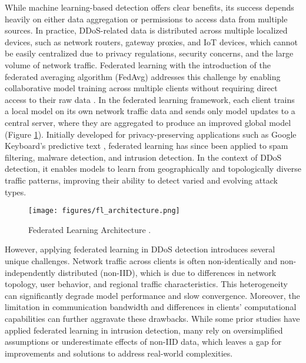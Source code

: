 While machine learning-based detection offers clear benefits, its success depends heavily on either data aggregation or permissions to access data from multiple sources. In practice, DDoS-related data is distributed across multiple localized devices, such as network routers, gateway proxies, and IoT devices, which cannot be easily centralized due to privacy regulations, security concerns, and the large volume of network traffic. Federated learning with the introduction of the federated averaging algorithm (FedAvg) addresses this challenge by enabling collaborative model training across multiple clients without requiring direct access to their raw data \citep{mcmahan2023communication}. In the federated learning framework, each client trains a local model on its own network traffic data and sends only model updates to a central server, where they are aggregated to produce an improved global model (Figure \ref{fig:fl_architecture}). Initially developed for privacy-preserving applications such as Google Keyboard’s predictive text \citep{47586}, federated learning has since been applied to spam filtering, malware detection, and intrusion detection. In the context of DDoS detection, it enables models to learn from geographically and topologically diverse traffic patterns, improving their ability to detect varied and evolving attack types.

\begin{figure}[h]
    \centering
    \texttt{[image: figures/fl\_architecture.png]}
    \caption{Federated Learning Architecture \citep{gfg-fl-architecture}.}
    \label{fig:fl_architecture}
\end{figure}

However, applying federated learning in DDoS detection introduces several unique challenges. Network traffic across clients is often non-identically and non-independently distributed (non-IID), which is due to differences in network topology, user behavior, and regional traffic characteristics. This heterogeneity can significantly degrade model performance and slow convergence. Moreover, the limitation in communication bandwidth and differences in clients' computational capabilities can further aggravate these drawbacks. While some prior studies have applied federated learning in intrusion detection, many rely on oversimplified assumptions or underestimate effects of non-IID data, which leaves a gap for improvements and solutions to address real-world complexities.

